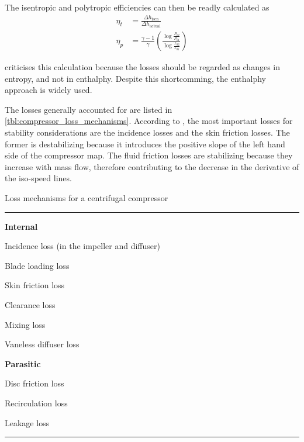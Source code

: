 \documentclass[tcc]{subfiles}
\begin{document}
The isentropic and polytropic efficiencies can then be readly calculated as
\begin{align}
    \eta_t &= \frac{\Delta h_{\text{isen}}}{\Delta h_{\text{actual}}}\\
    \eta_p &= \frac{\gamma-1}{\gamma} \left(\frac{\log\frac{P_{02}}{P_{01}}}
                                                 {\log\frac{T_{02}}{T_{01}}}
                                     \right)
\end{align}

\textcite{Aungier1995} criticises this calculation because the losses should be regarded as changes in entropy, and not in enthalphy. Despite this shortcomming, the enthalphy approach is widely used.

The losses generally accounted for are listed in \cref{tbl:compressor_loss_mechanisms}. According to \textcite{Gravdahl2004,Gravdahl1999,Ferguson1963,Watson1982}, the most important losses for stability considerations are the incidence losses and the skin friction losses. The former is destabilizing because it introduces the positive slope of the left hand side of the compressor map. The fluid friction losses are stabilizing because they increase with mass flow, therefore contributing to the decrease in the derivative of the iso-speed lines.
\begin{table}
\caption{Loss mechanisms for a centrifugal compressor}
\label{tbl:compressor_loss_mechanisms}
\hrule
\begin{multicols}{2}
\begin{compactitem}
    \item[] \textbf{Internal}
    \item Incidence loss (in the impeller and diffuser)
    \item Blade loading loss
    \item Skin friction loss
    \item Clearance loss
    \item Mixing loss
    \item Vaneless diffuser loss
    \columnbreak
    \item[] \textbf{Parasitic}
    \item Disc friction loss
    \item Recirculation loss
    \item Leakage loss
\end{compactitem}
\end{multicols}
\hrule
{}
\end{table}
\end{document}
